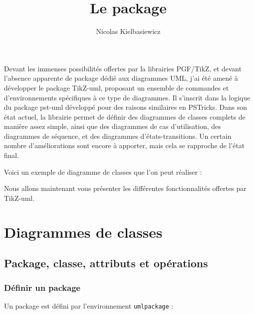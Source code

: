 \documentclass[a4paper,11pt]{report}
\title{Le package \tuml} %
\author{Nicolas {\sc Kielbasiewicz}} %
\newcommand{\inputTikZ}[1]{%
  }%
\newcommand{\inputTikZ}[1]{%
    \texttt{[image: fig/\#1.pdf]}%
  }%
\newcommand{\tuml}{{\sc TikZ-uml}}
\begin{document}
\maketitle

Devant les immenses possibilités offertes par la librairies {\sc PGF/TikZ}, et devant l'absence apparente de package dédié aux diagrammes UML, j'ai été amené à développer le package \tuml, proposant un ensemble de commandes et d'environnements spécifiques à ce type de diagrammes. Il s'inscrit dans la logique du package pst-uml développé pour des raisons similaires en {\sc PSTricks}. Dans son état actuel, la librairie permet de définir des diagrammes de classes complets de manière assez simple, ainsi que des diagrammes de cas d'utilisation, des diagrammes de séquence, et des diagrammes d'états-transitions. Un certain nombre d'améliorations sont encore à apporter, mais cela se rapproche de l'état final.

Voici un exemple de diagramme de classes que l'on peut réaliser :

\begin{center}
\inputTikZ{classdiagex}
\end{center}

Nous allons maintenant vous présenter les différentes fonctionnalités offertes par \tuml.

\tableofcontents

\chapter{Diagrammes de classes}\label{c.class}

\section{Package, classe, attributs et opérations}\label{s.packageclass}

\subsection{Définir un package}\label{ss.package}

Un package est défini par l'environnement {\tt umlpackage} :

\medskip

\begin{minipage}{0.5\textwidth}

\end{minipage}
\begin{minipage}{0.4\textwidth}
\begin{center}
\inputTikZ{package}
\end{center}
\end{minipage}
\end{document}
